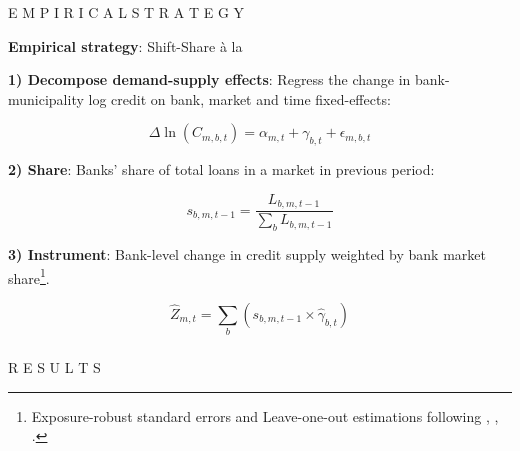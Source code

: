 \documentclass[aspectratio=169]{beamer} %
\begin{document}
\begin{frame}[noframenumbering]
\frametitle{}

\begin{center}
    \LARGE E M P I R I C A L \quad S T R A T E G Y
\end{center}

\end{frame}


\begin{frame}{\textbf{Empirical strategy}: Shift-Share à la \cite{greenstone2020credit}} \label{theory_shift}

\textbf{1) Decompose demand-supply effects}: Regress the change in bank-municipality log credit on bank, market and time fixed-effects:

\begin{equation*}
    \Delta \ln(C_{m,b,t}) = \alpha_{m,t} + \gamma_{b,t} + \epsilon_{m,b,t}
\end{equation*}

\vspace{3mm}

\pause

\textbf{2) Share}: Banks' share of total loans in a market in previous period:

\begin{equation*}
    s_{b,m,t-1} = \frac{L_{b,m,t-1}}{\sum_b L_{b,m,t-1}}
\end{equation*}

\vspace{3mm}

\pause

\textbf{3) Instrument}: Bank-level change in credit supply weighted by bank market share\footnote{Exposure-robust standard errors and Leave-one-out estimations following \cite{adao2019shiftshare}, \cite{krusell2010labour}, \cite{borusyak2022quasi}.}.

\begin{equation*}
    \hat{Z}_{m,t} = \sum_b \left( s_{b,m,t-1} \times \hat{\gamma}_{b,t} \right)
\end{equation*}

\end{frame}


\begin{frame}[noframenumbering]
\frametitle{}

\begin{center}
    \LARGE R E S U L T S
\end{center}

\end{frame}
\end{document}
